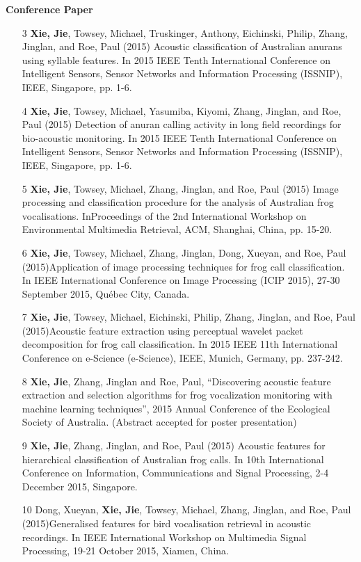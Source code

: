 { \large \textbf{Conference Paper}}
\begin{enumerate} 
\item[3]	\textbf{Xie, Jie}, Towsey, Michael, Truskinger, Anthony, Eichinski, Philip, Zhang, Jinglan, and Roe, Paul (2015) Acoustic classification of Australian anurans using syllable features. In 2015 IEEE Tenth International Conference on Intelligent Sensors, Sensor Networks and Information Processing (ISSNIP), IEEE, Singapore, pp. 1-6.

\item[4]	\textbf{Xie, Jie}, Towsey, Michael, Yasumiba, Kiyomi, Zhang, Jinglan, and Roe, Paul (2015) Detection of anuran calling activity in long field recordings for bio-acoustic monitoring. In 2015 IEEE Tenth International Conference on Intelligent Sensors, Sensor Networks and Information Processing (ISSNIP), IEEE, Singapore, pp. 1-6.
\item[5]	\textbf{Xie, Jie}, Towsey, Michael, Zhang, Jinglan, and Roe, Paul (2015) Image processing and classification procedure for the analysis of Australian frog vocalisations. InProceedings of the 2nd International Workshop on Environmental Multimedia Retrieval, ACM, Shanghai, China, pp. 15-20.
\item[6]	\textbf{Xie, Jie}, Towsey, Michael, Zhang, Jinglan, Dong, Xueyan, and Roe, Paul (2015)Application of image processing techniques for frog call classification. In IEEE International Conference on Image Processing (ICIP 2015), 27-30 September 2015, Québec City, Canada.

\item[7]	\textbf{Xie, Jie}, Towsey, Michael, Eichinski, Philip, Zhang, Jinglan, and Roe, Paul (2015)Acoustic feature extraction using perceptual wavelet packet decomposition for frog call classification. In 2015 IEEE 11th International Conference on e-Science (e-Science), IEEE, Munich, Germany, pp. 237-242.

\item[8]	\textbf{Xie, Jie}, Zhang, Jinglan and Roe, Paul,  “Discovering acoustic feature extraction and selection algorithms for frog vocalization monitoring with machine learning techniques”, 2015 Annual Conference of the Ecological Society of Australia. (Abstract accepted for poster presentation) 

\item[9]	\textbf{Xie, Jie}, Zhang, Jinglan, and Roe, Paul (2015) Acoustic features for hierarchical classification of Australian frog calls. In 10th International Conference on Information, Communications and Signal Processing, 2-4 December 2015, Singapore.

\item[10]	Dong, Xueyan, \textbf{Xie, Jie}, Towsey, Michael, Zhang, Jinglan, and Roe, Paul (2015)Generalised features for bird vocalisation retrieval in acoustic recordings. In IEEE International Workshop on Multimedia Signal Processing, 19-21 October 2015, Xiamen, China.

\end{enumerate} 



